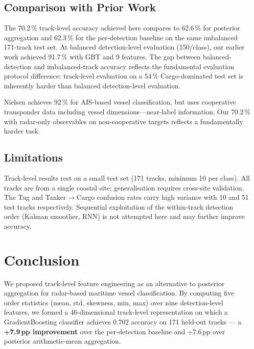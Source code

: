 \documentclass[10pt,journal,compsoc]{IEEEtran}
\begin{document}
\subsection{Comparison with Prior Work}

The 70.2\,\% track-level accuracy achieved here compares to 62.6\,\%
for posterior aggregation and 62.3\,\% for the per-detection baseline
on the same imbalanced 171-track test set.  At balanced detection-level
evaluation (150/class), our earlier work \cite{paper6_kinrcs} achieved
91.7\,\% with GBT and 9 features.  The gap between balanced-detection and
imbalanced-track accuracy reflects the fundamental evaluation protocol
difference: track-level evaluation on a 54\,\% Cargo-dominated test set
is inherently harder than balanced detection-level evaluation.

Nielsen \cite{nielsen_2025} achieves 92\,\% for AIS-based vessel
classification, but uses cooperative transponder data including vessel
dimensions---near-label information.  Our 70.2\,\% with radar-only
observables on non-cooperative targets reflects a fundamentally harder task.

\subsection{Limitations}
Track-level results rest on a small test set (171 tracks, minimum 10 per class).
All tracks are from a single coastal site; generalisation requires cross-site
validation.  The Tug and Tanker$\to$Cargo confusion rates carry high variance
with 10 and 51 test tracks respectively.  Sequential exploitation of the
within-track detection order (Kalman smoother, RNN) is not attempted here
and may further improve accuracy.

\section{Conclusion}\label{sec:conclusion}

We proposed track-level feature engineering as an alternative to posterior
aggregation for radar-based maritime vessel classification.  By computing
five order statistics (mean, std, skewness, min, max) over nine detection-level
features, we formed a 46-dimensional track-level representation on which a
GradientBoosting classifier achieves 0.702 accuracy on 171 held-out tracks
--- a \textbf{+7.9\,pp improvement} over the per-detection baseline and
+7.6\,pp over posterior arithmetic-mean aggregation.
\end{document}
